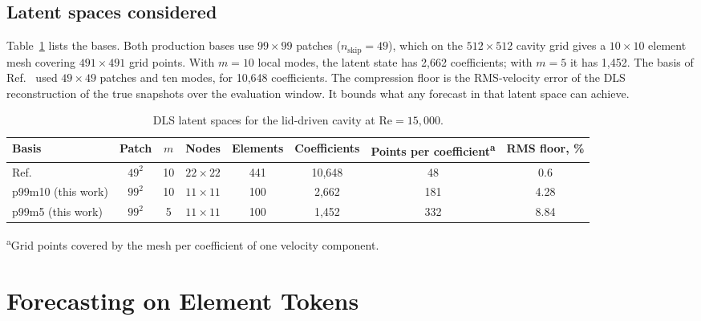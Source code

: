 \documentclass[conf]{new-aiaa}
\newcommand{\Rey}{\mathrm{Re}}
\begin{document}
\subsection{Latent spaces considered}
Table~\ref{tab:latent} lists the bases. Both production bases use $99\times99$ patches ($n_\mathrm{skip}=49$), which on the $512\times512$ cavity grid gives a $10\times10$ element mesh covering $491\times491$ grid points. With $m=10$ local modes, the latent state has 2,662 coefficients; with $m=5$ it has 1,452. The basis of Ref.~\cite{morton2026scitech} used $49\times49$ patches and ten modes, for 10,648 coefficients. The compression floor is the RMS-velocity error of the DLS reconstruction of the true snapshots over the evaluation window. It bounds what any forecast in that latent space can achieve.

\begin{table}[!tbp]
  \centering
  \small
  \caption{DLS latent spaces for the lid-driven cavity at $\Rey=15{,}000$.}
  \label{tab:latent}
  \begin{tabular}{lccccccc}
    \toprule
    Basis & Patch & $m$ & Nodes & Elements & Coefficients & Points per coefficient\textsuperscript{a} & RMS floor, \% \\
    \midrule
    Ref.~\cite{morton2026scitech} & $49^2$ & 10 & $22\times22$ & 441 & 10,648 & 48 & 0.6 \\
    p99m10 (this work) & $99^2$ & 10 & $11\times11$ & 100 & 2,662 & 181 & 4.28 \\
    p99m5 (this work)  & $99^2$ & 5  & $11\times11$ & 100 & 1,452 & 332 & 8.84 \\
    \bottomrule
  \end{tabular}

  \smallskip
  {\footnotesize \textsuperscript{a}Grid points covered by the mesh per coefficient of one velocity component.}
\end{table}

\section{Forecasting on Element Tokens}
\label{sec:model}
\end{document}
